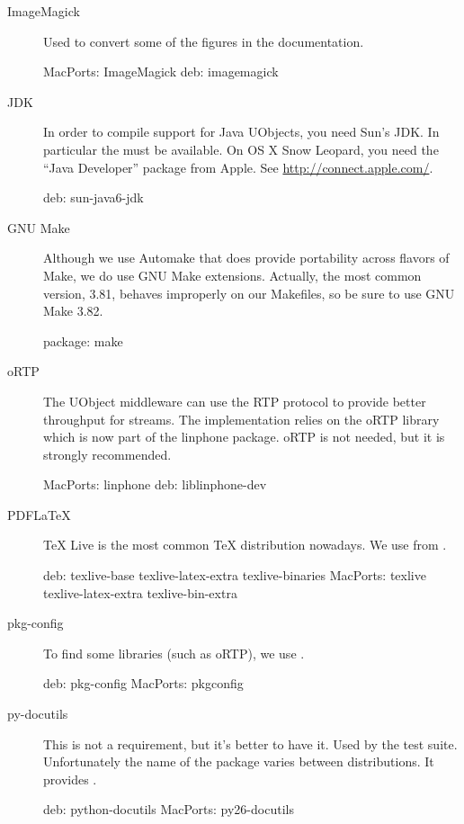 \begin{description}
\item[ImageMagick] Used to convert some of the figures in the
  documentation.
\begin{package}
MacPorts: ImageMagick
deb: imagemagick
\end{package}

\item[JDK] In order to compile support for Java UObjects, you need Sun's
  JDK.  In particular the  must be available.  On OS X Snow
  Leopard, you need the ``Java Developer'' package from Apple.  See
  \url{http://connect.apple.com/}.
\begin{package}
deb: sun-java6-jdk
\end{package}

\item[GNU Make] Although we use Automake that does provide portability
  across flavors of Make, we do use GNU Make extensions.  Actually, the most
  common version, 3.81, behaves improperly on our Makefiles, so be sure to
  use GNU Make 3.82.
\begin{package}
package: make
\end{package}

\item[oRTP] The UObject middleware can use the RTP protocol to provide
  better throughput for streams.  The implementation relies on the oRTP
  library which is now part of the linphone package.  oRTP is not needed,
  but it is strongly recommended.
\begin{package}
MacPorts: linphone
deb: liblinphone-dev
\end{package}

\item[PDFLaTeX] TeX Live is the most common \TeX{} distribution nowadays.
  We use  from .
\begin{package}
deb: texlive-base texlive-latex-extra texlive-binaries
MacPorts: texlive texlive-latex-extra texlive-bin-extra
\end{package}

\item[pkg-config] To find some libraries (such as oRTP), we use
  .
\begin{package}
deb: pkg-config
MacPorts: pkgconfig
\end{package}

\item[py-docutils] This is not a requirement, but it's better to have
  it.  Used by the test suite.  Unfortunately the name of the package
  varies between distributions.  It provides .
\begin{package}
deb: python-docutils
MacPorts: py26-docutils
\end{package}


\end{description}
